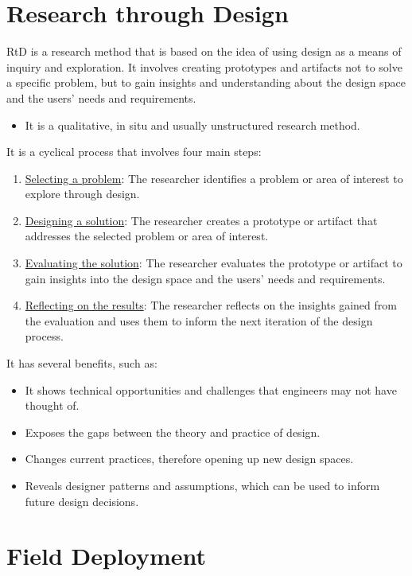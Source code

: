 \section{Research through Design}

RtD is a research method that is based on the idea of using design as a means of inquiry and exploration. It involves creating prototypes and artifacts not to solve a specific problem, but to gain insights and understanding about the design space and the users' needs and requirements.
\begin{itemize}
    \item It is a qualitative, in situ and usually unstructured research method.
\end{itemize}

It is a cyclical process that involves four main steps:
\begin{enumerate}
    \item \ul{Selecting a problem}: The researcher identifies a problem or area of interest to explore through design.
    \item \ul{Designing a solution}: The researcher creates a prototype or artifact that addresses the selected problem or area of interest.
    \item \ul{Evaluating the solution}: The researcher evaluates the prototype or artifact to gain insights into the design space and the users' needs and requirements.
    \item \ul{Reflecting on the results}: The researcher reflects on the insights gained from the evaluation and uses them to inform the next iteration of the design process.
\end{enumerate}

It has several benefits, such as:
\begin{itemize}
    \item It shows technical opportunities and challenges that engineers may not have thought of.
    \item Exposes the gaps between the theory and practice of design.
    \item Changes current practices, therefore opening up new design spaces.
    \item Reveals designer patterns and assumptions, which can be used to inform future design decisions.
\end{itemize}

\section{Field Deployment}

